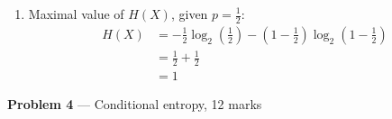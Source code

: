 \documentclass[11pt]{article}
\newcommand{\logbin}{\log_2}
\theoremstyle{definition}
\begin{document}
\begin{enumerate}
\begin{proof}
    \end{proof}
  \item
    Maximal value of $H(X)$, given $p = \frac{1}{2}$:
    \begin{equation*}
    \begin{aligned}
      H(X) &= -\frac{1}{2}\logbin (\frac{1}{2}) - (1 - \frac{1}{2})\logbin (1 - \frac{1}{2}) \\
           &= \frac{1}{2} + \frac{1}{2} \\
           &= 1
    \end{aligned}
    \end{equation*}
\end{enumerate}

\item[] \textbf{Problem 4} --- Conditional entropy, 12 marks
\end{document}
